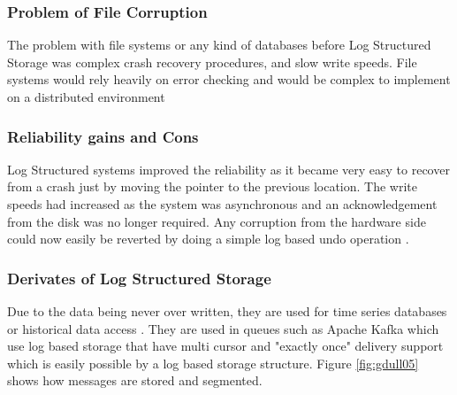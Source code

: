 \documentclass[12pt,a4paper]{article}
\begin{document}
\subsubsection{Problem of File Corruption}
The problem with file systems or any kind of databases before Log Structured Storage was complex crash recovery procedures, and slow write speeds. File systems would rely heavily on error checking and would be complex to implement on a distributed environment \citep{swinehart1979wfs}
	
\subsubsection{Reliability gains and Cons}
Log Structured systems improved the reliability as it became very easy to recover from a crash just by moving the pointer to the previous location. The write speeds had increased as the system was asynchronous and an acknowledgement from the disk was no longer required. Any corruption from the hardware side could now easily be reverted by doing a simple log based undo operation \citep{reuter1980fast}.

\subsubsection{Derivates of Log Structured Storage}
Due to the data being never over written, they are used for time series databases or historical data access \citep{muth2000lham}. They are used in queues such as Apache Kafka which use log based storage that have multi cursor and "exactly once" delivery support\citep{kreps2011kafka} which is easily possible by a log based storage structure. Figure \ref{fig:gdull05} shows how messages are stored and segmented.  \\
\end{document}
